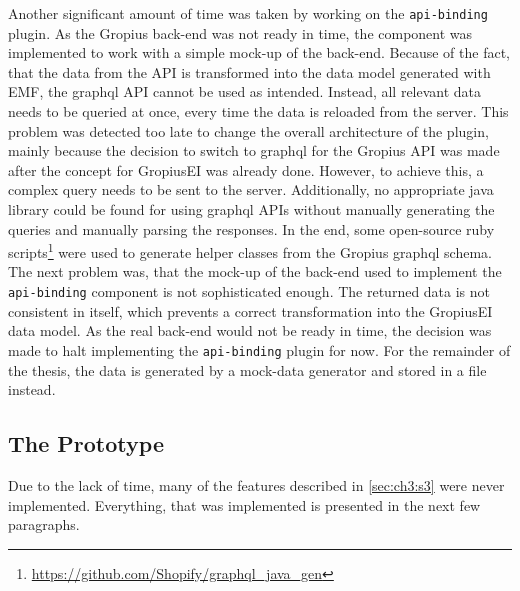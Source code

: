 Another significant amount of time was taken by working on the \lstinline|api-binding| plugin.
As the \gls{Gropius} back-end was not ready in time, the component was implemented to work with a simple mock-up of the back-end.
Because of the fact, that the data from the \gls{API} is transformed into the data model generated with \gls{EMF}, 
the \gls{graphql} \gls{API} cannot be used as intended.
Instead, all relevant data needs to be queried at once, every time the data is reloaded from the server.
This problem was detected too late to change the overall architecture of the plugin, 
mainly because the decision to switch to \gls{graphql} for the \gls{Gropius} \gls{API} was made after the concept for \gls{GropiusEI} was already done.
However, to achieve this, a complex query needs to be sent to the server.
Additionally, no appropriate \gls{java} library could be found for using \gls{graphql} \glspl{API} without manually generating the queries and manually parsing the responses. 
In the end, some open-source ruby scripts\footnote{\url{https://github.com/Shopify/graphql_java_gen}} were used to generate helper classes from the \gls{Gropius} \gls{graphql} schema.
The next problem was, that the mock-up of the back-end used to implement the \lstinline|api-binding| component is not sophisticated enough.
The returned data is not consistent in itself, which prevents a correct transformation into the \gls{GropiusEI} data model.
As the real back-end would not be ready in time, the decision was made to halt implementing the \lstinline|api-binding| plugin for now.
For the remainder of the thesis, the data is generated by a mock-data generator and stored in a file instead.

\subsection*{The Prototype}
Due to the lack of time, many of the features described in \cref{sec:ch3:s3} were never implemented.
Everything, that was implemented is presented in the next few paragraphs.

